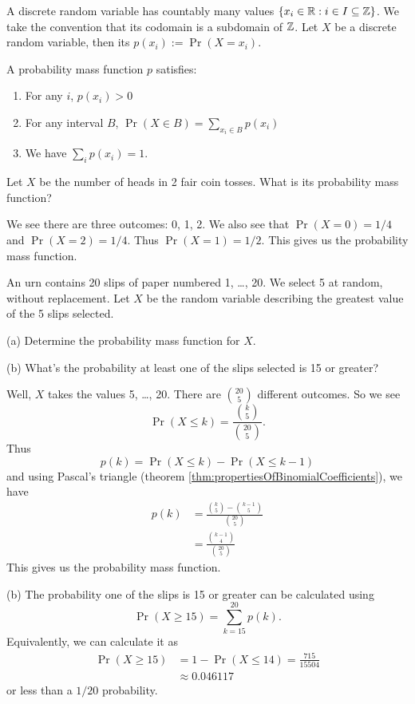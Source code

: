 \M
A discrete random variable has countably many values $\{x_{i}\in\mathbb{R} :
i\in I\subseteq\mathbb{Z}\}$. We take the
convention that its codomain is a subdomain of $\mathbb{Z}$. Let $X$ be a
discrete random variable, then its 
$p(x_{i}):=\Pr(X=x_{i})$.

A probability mass function $p$ satisfies:
\begin{enumerate}
\item For any $i$, $p(x_{i})>0$
\item For any interval $B$, $\Pr(X\in B)=\sum_{x_{i}\in B}p(x_{i})$
\item We have $\sum_{i}p(x_{i})=1$.
\end{enumerate}

Let $X$ be the number of heads in 2 fair coin tosses. What is its
probability mass function?

 We see there are three outcomes: 0, 1, 2. We also see
that $\Pr(X=0)=1/4$ and $\Pr(X=2)=1/4$. Thus $\Pr(X=1)=1/2$. This gives
us the probability mass function.

An urn contains 20 slips of paper numbered 1, \dots, 20. We select 5 at
random, without replacement. Let $X$ be the random variable describing
the greatest value of the 5 slips selected. 

(a) Determine the probability mass function for $X$.

(b) What's the probability at least one of the slips selected is 15 or
greater?

Well, $X$ takes the values 5, \dots, 20. There are $\binom{20}{5}$
different outcomes. So we see
\begin{equation}
\Pr(X\leq k)=\frac{\binom{k}{5}}{\binom{20}{5}}.
\end{equation}
Thus
\begin{equation}
p(k)=\Pr(X\leq k)-\Pr(X\leq k-1)
\end{equation}
and using Pascal's triangle
(theorem \ref{thm:propertiesOfBinomialCoefficients}), we have
\begin{equation}
\begin{split}
p(k) &=\frac{\binom{k}{5}-\binom{k-1}{5}}{\binom{20}{5}}\\
&=\frac{\binom{k-1}{4}}{\binom{20}{5}}
\end{split}
\end{equation}
This gives us the probability mass function.

(b) The probability one of the slips is 15 or greater can be calculated
using
\begin{equation}
\Pr(X\geq15)=\sum^{20}_{k=15}p(k).
\end{equation}
Equivalently, we can calculate it as
\begin{equation}
\begin{split}
\Pr(X\geq15)&=1-\Pr(X\leq14)=\frac{715}{15504}\\
&\approx 0.046117
\end{split}
\end{equation}
or less than a $1/20$ probability.

